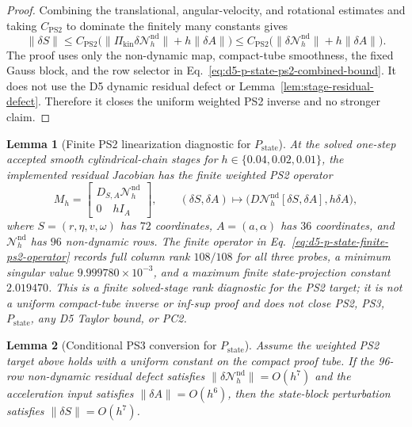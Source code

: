 \documentclass[preprint,12pt]{elsarticle}
\newtheorem{lemma}{Lemma}
\begin{document}
\begin{proof}
Combining the translational, angular-velocity, and rotational estimates and
taking \(C_{\mathrm{PS2}}\) to dominate the finitely many constants gives
\begin{equation}
\label{eq:d5-p-state-ps2-combined-bound}
  \|\delta S\|\le C_{\mathrm{PS2}}
  \bigl(\|\Pi_{\mathrm{kin}}\delta\mathcal N_h^{\mathrm{nd}}\|
      +h\|\delta A\|\bigr)
  \le C_{\mathrm{PS2}}
  \bigl(\|\delta\mathcal N_h^{\mathrm{nd}}\|+h\|\delta A\|\bigr).
\end{equation}
The proof uses only the non-dynamic map, compact-tube smoothness, the fixed
Gauss block, and the row selector in Eq.~\eqref{eq:d5-p-state-ps2-combined-bound}.
It does not use the D5 dynamic residual
defect or Lemma~\ref{lem:stage-residual-defect}.  Therefore it closes the
uniform weighted PS2 inverse and no stronger claim.
\end{proof}

\begin{lemma}[Finite PS2 linearization diagnostic for \(P_{\mathrm{state}}\)]
\label{lem:d5-p-state-ps2-linearization-probe}
At the solved one-step accepted smooth cylindrical-chain stages for
\(h\in\{0.04,0.02,0.01\}\), the implemented residual Jacobian has the finite
weighted PS2 operator
\begin{equation}
\label{eq:d5-p-state-finite-ps2-operator}
M_h=\begin{bmatrix}
D_{S,A}\mathcal N_h^{\mathrm{nd}}\\[2pt]
0\quad hI_A
\end{bmatrix},
\qquad
(\delta S,\delta A)\mapsto
\bigl(D\mathcal N_h^{\mathrm{nd}}[\delta S,\delta A],h\delta A\bigr),
\end{equation}
where \(S=(r,\eta,v,\omega)\) has \(72\) coordinates, \(A=(a,\alpha)\)
has \(36\) coordinates, and \(\mathcal N_h^{\mathrm{nd}}\) has \(96\)
non-dynamic rows.  The finite operator in Eq.~\eqref{eq:d5-p-state-finite-ps2-operator}
records full column rank \(108/108\)
for all three probes, a minimum singular value \(9.999780\times 10^{-3}\), and
a maximum finite state-projection constant \(2.019470\).  This is a finite
solved-stage rank diagnostic for the PS2 target; it is not a
uniform compact-tube inverse or inf-sup proof and does not close PS2, PS3,
\(P_{\mathrm{state}}\), any D5 Taylor bound, or PC2.
\end{lemma}

\begin{lemma}[Conditional PS3 conversion for \(P_{\mathrm{state}}\)]
\label{lem:d5-p-state-ps3-conditional-conversion}
Assume the weighted PS2 target above holds with a uniform constant on the
compact proof tube.  If the 96-row non-dynamic residual defect satisfies
\(\|\delta\mathcal N_h^{\mathrm{nd}}\|=O(h^7)\) and the acceleration input
satisfies \(\|\delta A\|=O(h^6)\), then the state-block perturbation satisfies
\(\|\delta S\|=O(h^7)\).
\end{lemma}
\end{document}
